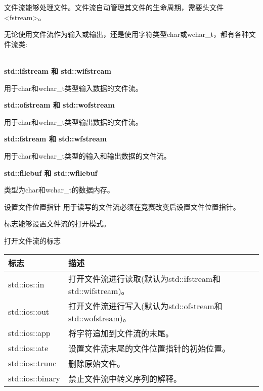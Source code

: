 
文件流能够处理文件。文件流自动管理其文件的生命周期，需要头文件<fstream>。

无论使用文件流作为输入或输出，还是使用字符类型char或wchar\_t，都有各种文件流类:

\noindent
\\\textbf{std::ifstream 和 std::wifstream}

用于char和wchar\_t类型输入数据的文件流。

\noindent
\textbf{std::ofstream 和 std::wofstream}

用于char和wchar\_t类型输出数据的文件流。

\noindent
\textbf{std::fstream 和 std::wfstream}

用于char和wchar\_t类型的输入和输出数据的文件流。

\noindent
\textbf{std::filebuf 和 std::wfilebuf}

类型为char和wchar\_t的数据内存。\\

\begin{myWarning}{设置文件位置指针}
用于读写的文件流必须在竞赛改变后设置文件位置指针。
\end{myWarning}

标志能够设置文件流的打开模式。

\begin{center}
打开文件流的标志
\end{center}

\begin{longtable}[c]{|l|l|}
\hline
\textbf{标志}    & \textbf{描述}                                                             \\ \hline
\endfirsthead
%
\endhead
%
std::ios::in     & 打开文件流进行读取(默认为std::ifstream和std::wifstream)。 \\ \hline
std::ios::out    & 打开文件流进行写入(默认为std::ofstream和std::wofstream)。 \\ \hline
std::ios::app    & 将字符追加到文件流的末尾。                             \\ \hline
std::ios::ate & 设置文件流末尾的文件位置指针的初始位置。 \\ \hline
std::ios::trunc  & 删除原始文件。                                                       \\ \hline
std::ios::binary & 禁止文件流中转义序列的解释。          \\ \hline
\end{longtable}

